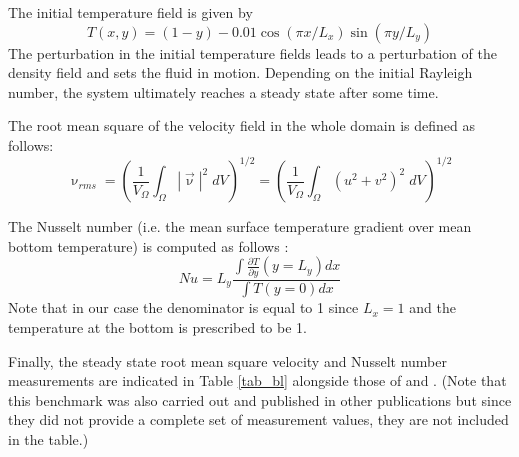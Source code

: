 The initial temperature field is given by 
\begin{equation}
T(x,y)=(1-y) - 0.01\cos(\pi x/L_x) \sin(\pi y/L_y)
\end{equation}
The perturbation in the initial temperature fields leads to 
a perturbation of the density field and sets the fluid in motion. 
Depending on the initial Rayleigh number, the system ultimately reaches a 
steady state after some time. 

The root mean square of the velocity field in the whole domain is defined as 
follows:
\begin{equation}
\upnu_{rms}
= \left( \frac{1}{V_\Omega} \int_\Omega |{\vec \upnu}|^2 \; dV \right)^{1/2} 
= \left( \frac{1}{V_\Omega} \int_\Omega (u^2+v^2)^2 \; dV \right)^{1/2} 
\label{eq_vrms}
\end{equation}


The Nusselt number (i.e. the mean surface temperature gradient over mean bottom temperature)
is computed as follows \cite{blbc89}:
\begin{equation}
Nu = L_y \frac{\int \frac{\partial T}{\partial y}(y=L_y) dx  }{\int T(y=0) dx}
\label{eqNu}
\end{equation}
Note that in our case the denominator is equal to 1 since $L_x=1$ and the temperature at the 
bottom is prescribed to be 1.


Finally, the steady state root mean square velocity and Nusselt number measurements
are indicated in Table \ref{tab_bl} alongside those of \cite{blbc89} and \cite{tack94}.
(Note that this benchmark was also carried out and published in 
other publications \cite{trha98,albe00,gery10,dawk11,lezh11} but since they did not provide  a complete set 
of measurement values, they are not included in the table.)


